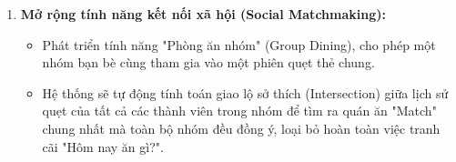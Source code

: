 \begin{enumerate}
    \item \textbf{Mở rộng tính năng kết nối xã hội (Social Matchmaking):}
    \begin{itemize}
        \item Phát triển tính năng "Phòng ăn nhóm" (Group Dining), cho phép một nhóm bạn bè cùng tham gia vào một phiên quẹt thẻ chung.
        \item Hệ thống sẽ tự động tính toán giao lộ sở thích (Intersection) giữa lịch sử quẹt của tất cả các thành viên trong nhóm để tìm ra quán ăn "Match" chung nhất mà toàn bộ nhóm đều đồng ý, loại bỏ hoàn toàn việc tranh cãi "Hôm nay ăn gì?".
    \end{itemize}
\end{enumerate}
